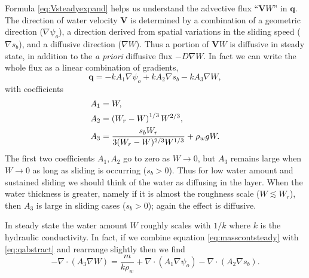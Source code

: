 \documentclass[gmd]{copernicus}   %
\newcommand\bV{\mathbf{V}}
\newcommand\bq{\mathbf{q}}
\newcommand{\Div}{\nabla\cdot}
\newcommand{\grad}{\nabla}
\begin{document}
Formula \eqref{eq:Vsteadyexpand} helps us understand the advective flux ``$\bV W$'' in $\bq$.  The direction of water velocity $\bV$ is determined by a combination of a geometric direction ($\grad \psi_o$), a direction derived from spatial variations in the sliding speed ($\grad s_b$), and a diffusive direction ($\grad W$).  Thus a portion of $\bV W$ is diffusive in steady state, in addition to the \emph{a priori} diffusive flux $- D \grad W$.  In fact we can write the whole flux as a linear combination of gradients,
\begin{equation}
\bq = - k A_1 \grad \psi_o + k A_2 \grad s_b - k A_3 \grad W,  \label{eq:qabstract}
\end{equation}
with coefficients
\begin{align}
&A_1 = W, \label{eq:qcoefficient} \\
&A_2 = \left(W_r - W\right)^{1/3} W^{2/3}, \notag \\
&A_3 = \frac{s_b W_r}{3 (W_r - W)^{2/3} W^{1/3}} + \rho_w g W. \notag
\end{align}
The first two coefficients $A_1,A_2$ go to zero as $W\to 0$, but $A_3$ remains large when $W\to 0$ as long as sliding is occurring ($s_b > 0$).  Thus for low water amount and sustained sliding we should think of the water as diffusing in the layer.  When the water thickness is greater, namely if it is almost the roughness scale ($W\lesssim W_r$), then $A_3$ is large in sliding cases ($s_b>0$); again the effect is diffusive.

In steady state the water amount $W$ roughly scales with $1/k$ where $k$ is the hydraulic conductivity.  In fact, if we combine equation \eqref{eq:masscontsteady} with \eqref{eq:qabstract} and rearrange slightly then we find
\begin{equation}
-\Div \left(A_3 \grad W\right) = \frac{m}{k \rho_w} + \Div \left(A_1 \grad \psi_o\right) - \Div \left(A_2 \grad s_b\right).  \label{eq:ellipticforWsteadyone}
\end{equation}
\end{document}
